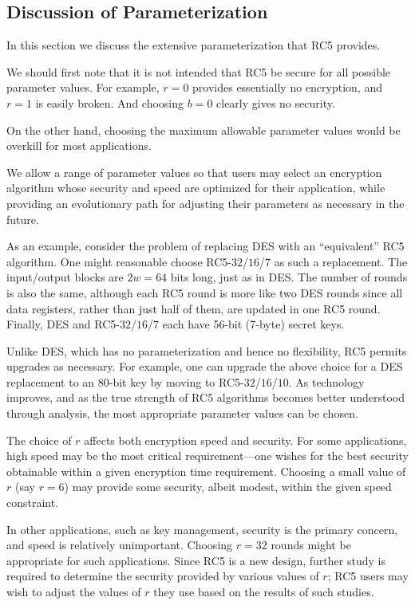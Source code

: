 \subsection{Discussion of Parameterization}

In this section we discuss the extensive parameterization that RC5
provides.

We should first note that it is not intended that RC5 be secure for
all possible parameter values.  For example, $r = 0$ provides
essentially no encryption, and $r = 1$ is easily broken.  And choosing
$b = 0$ clearly gives no security.

On the other hand, choosing the maximum allowable parameter values
would be overkill for most applications.

We allow a range of parameter values so that users may
select an encryption algorithm whose security and speed are optimized
for their application, while providing an evolutionary path for
adjusting their parameters as necessary in the future.

As an example, consider the problem of replacing DES with an
``equivalent'' RC5 algorithm.  One might reasonable choose
RC5-$32$/$16$/$7$ as such a replacement.  The
input/output blocks are $2w = 64$ bits long, just as in DES.  The
number of rounds is also the same, although each RC5 round is more like
two DES rounds since all data registers, rather than just
half of them, are updated in one RC5 round.  Finally, DES and
RC5-$32$/$16$/$7$ each have 56-bit (7-byte) secret keys.

Unlike DES, which has no parameterization and hence no flexibility,
RC5 permits upgrades as necessary.  For example, one can upgrade the
above choice for a DES replacement to an $80$-bit key by moving to
RC5-$32$/$16$/$10$.  As technology improves, and as the true strength
of RC5 algorithms becomes better understood through analysis, the most
appropriate parameter values can be chosen.

The choice of $r$ affects both encryption speed and security.  For
some applications, high speed may be the most critical
requirement---one wishes for the best security obtainable within a
given encryption time requirement.  Choosing a small value of $r$ (say
$r = 6$) may provide some security, albeit modest, within the given
speed constraint.

In other applications, such as key management, security is the primary
concern, and speed is relatively unimportant.  Choosing $r=32$
rounds might be appropriate for such applications.  Since RC5 is a new
design, further study is required to determine 
the security provided by various values of $r$; RC5 users may wish to 
adjust the values of $r$ they use based on the results of such studies.


